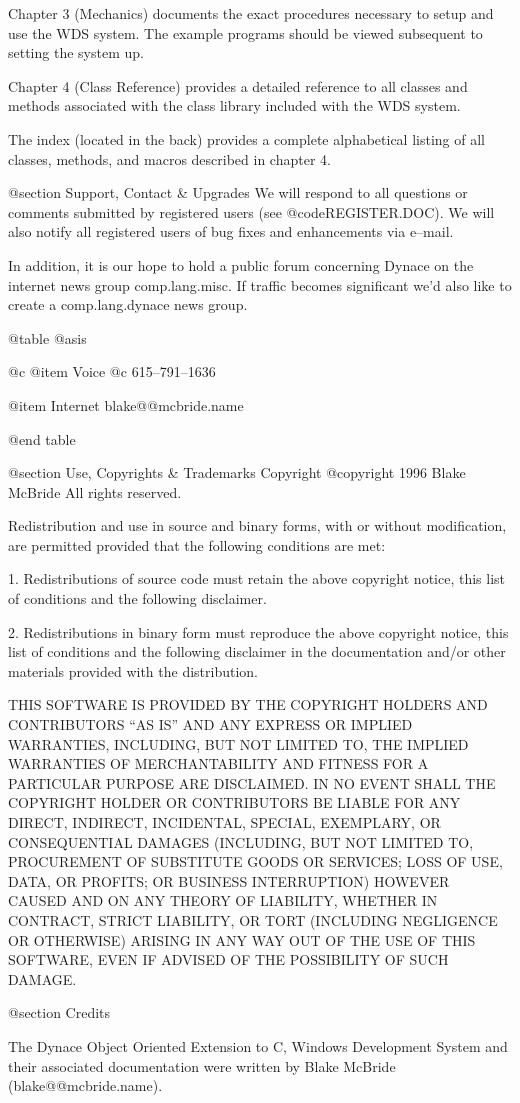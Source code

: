 Chapter 3 (Mechanics) documents the exact procedures necessary to setup
and use the WDS system.  The example programs should be viewed subsequent
to setting the system up.

Chapter 4 (Class Reference)  provides a detailed reference to all
classes and methods associated with the class library included
with the WDS system.

The index (located in the back) provides a complete alphabetical listing
of all classes, methods, and macros described in chapter 4.








@section Support, Contact & Upgrades
We will respond to all questions or comments submitted by registered
users (see @code{REGISTER.DOC}).  We will also notify all registered
users of bug fixes and enhancements via e--mail.

In addition, it is our hope to hold a public forum concerning Dynace on
the internet news group comp.lang.misc.  If traffic becomes significant
we'd also like to create a comp.lang.dynace news group.

@table @asis

@c @item Voice
@c 615--791--1636

@item Internet
blake@@mcbride.name

@end table




@section Use, Copyrights & Trademarks
Copyright  @copyright{} 1996 Blake McBride
All rights reserved.

Redistribution and use in source and binary forms, with or without
modification, are permitted provided that the following conditions are
met:

1. Redistributions of source code must retain the above copyright
notice, this list of conditions and the following disclaimer.

2. Redistributions in binary form must reproduce the above copyright
notice, this list of conditions and the following disclaimer in the
documentation and/or other materials provided with the distribution.

THIS SOFTWARE IS PROVIDED BY THE COPYRIGHT HOLDERS AND CONTRIBUTORS
``AS IS'' AND ANY EXPRESS OR IMPLIED WARRANTIES, INCLUDING, BUT NOT
LIMITED TO, THE IMPLIED WARRANTIES OF MERCHANTABILITY AND FITNESS FOR
A PARTICULAR PURPOSE ARE DISCLAIMED. IN NO EVENT SHALL THE COPYRIGHT
HOLDER OR CONTRIBUTORS BE LIABLE FOR ANY DIRECT, INDIRECT, INCIDENTAL,
SPECIAL, EXEMPLARY, OR CONSEQUENTIAL DAMAGES (INCLUDING, BUT NOT
LIMITED TO, PROCUREMENT OF SUBSTITUTE GOODS OR SERVICES; LOSS OF USE,
DATA, OR PROFITS; OR BUSINESS INTERRUPTION) HOWEVER CAUSED AND ON ANY
THEORY OF LIABILITY, WHETHER IN CONTRACT, STRICT LIABILITY, OR TORT
(INCLUDING NEGLIGENCE OR OTHERWISE) ARISING IN ANY WAY OUT OF THE USE
OF THIS SOFTWARE, EVEN IF ADVISED OF THE POSSIBILITY OF SUCH DAMAGE.


@section Credits

The Dynace Object Oriented Extension to C, Windows Development System
and their associated documentation were written by Blake McBride
(blake@@mcbride.name).


